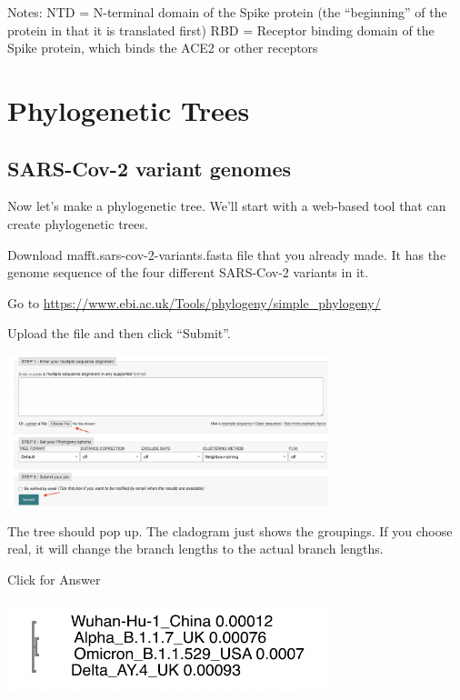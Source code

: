 \documentclass[
]{book}
\begin{document}
Notes:
NTD = N-terminal domain of the Spike protein (the ``beginning'' of the protein in that it is translated first)
RBD = Receptor binding domain of the Spike protein, which binds the ACE2 or other receptors

\hfill\break

\hypertarget{phylogenetic-trees}{%
\chapter{Phylogenetic Trees}\label{phylogenetic-trees}}

\hypertarget{sars-cov-2-variant-genomes-1}{%
\section{SARS-Cov-2 variant genomes}\label{sars-cov-2-variant-genomes-1}}

Now let's make a phylogenetic tree. We'll start with a web-based tool that can create phylogenetic trees.

Download mafft.sars-cov-2-variants.fasta file that you already made. It has the genome sequence of the four different SARS-Cov-2 variants in it.

Go to \url{https://www.ebi.ac.uk/Tools/phylogeny/simple_phylogeny/}

Upload the file and then click ``Submit''.

\includegraphics[width=0.7\textwidth,height=\textheight]{./Figures/SimplePhylogeny.png}

The tree should pop up. The cladogram just shows the groupings. If you choose real, it will change the branch lengths to the actual branch lengths.

Click for Answer

\includegraphics[width=0.7\textwidth,height=\textheight]{./Figures/real.png}
\end{document}
